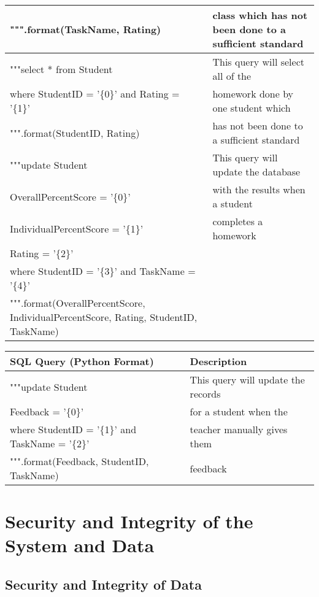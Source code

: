 \begin{center}
\begin{tabular}{|p{8cm}|p{6cm}|}
""".format(TaskName, Rating) & class which has not been done to a sufficient standard \\ \hline
"""select * from Student & This query will select all of the \\
where StudentID = '\{0\}' and Rating = '\{1\}' & homework done by one student which \\
""".format(StudentID, Rating) & has not been done to a sufficient standard \\ \hline
"""update Student & This query will update the database \\
OverallPercentScore = '\{0\}' & with the results when a student \\
IndividualPercentScore = '\{1\}' & completes a homework \\
Rating = '\{2\}' & \\
where StudentID = '\{3\}' and TaskName = '\{4\}' & \\
""".format(OverallPercentScore, IndividualPercentScore, Rating, StudentID, TaskName) & \\ \hline
\end{tabular}
\end{center}

\begin{center}
\begin{tabular}{|p{8cm}|p{6cm}|} \hline
\textbf{SQL Query (Python Format)} & \textbf{Description} \\ \hline
"""update Student & This query will update the records \\
Feedback = '\{0\}' & for a student when the \\
where StudentID = '\{1\}' and TaskName = '\{2\}' & teacher manually gives them \\
""".format(Feedback, StudentID, TaskName) & feedback \\ \hline
\end{tabular}
\end{center}

\section{Security and Integrity of the System and Data}

\subsection{Security and Integrity of Data}

